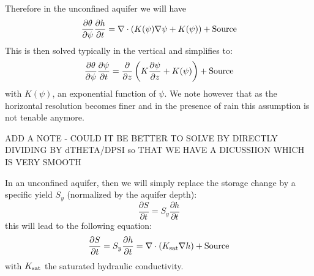 \documentclass{article}
\begin{document}
Therefore in the unconfined aquifer we will have 
\begin{equation}
     \frac{\partial \theta}{\partial \psi}\frac{\partial h}{\partial t} = \nabla \cdot \left( {K(\psi) \nabla \psi} + K(\psi) \right) + {\rm Source}
\label{Richards_simple_uns}
\end{equation}
This is then solved typically in the vertical and simplifies to:
\begin{equation}
     \frac{\partial \theta}{\partial \psi}\frac{\partial \psi}{\partial t} = \frac{\partial}{\partial z}  \left( {K \frac{\partial \psi}{\partial z} + K(\psi)} \right) + {\rm Source}
\label{Richards_simple_uns_1D}
\end{equation}
with $K(\psi)$, an exponential function of $\psi$.
We note however that as the horizontal resolution becomes finer and in the presence of rain this assumption is not tenable anymore.

ADD A NOTE - COULD IT BE BETTER TO SOLVE BY DIRECTLY DIVIDING BY dTHETA/DPSI so THAT WE HAVE A DICUSSIION WHICH IS VERY SMOOTH

In an unconfined aquifer, then we will simply replace the storage change by a specific yield $S_y$ (normalized by the aquifer depth):
\begin{equation}
     \frac{\partial S}{\partial t} = S_y \frac{\partial h}{\partial t}  
\end{equation}
this will lead to the following equation:
\begin{equation}
     \frac{\partial S}{\partial t} = S_y \frac{\partial h}{\partial t} = \nabla \cdot \left( {K_{\rm sat} \nabla h} \right) + {\rm Source}
\label{Richards_simple}
\end{equation}
with $K_{\rm sat}$ the saturated hydraulic conductivity. 
\end{document}

